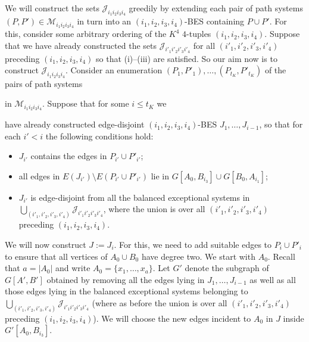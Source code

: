 \documentclass{memo-l}
\def\COMMENT#1{}
\def\proof{\removelastskip\penalty55\medskip\noindent{\bf Proof. }}
\def\cM{\mathcal{M}}
\numberwithin{section}{chapter}
\numberwithin{equation}{section}
\numberwithin{firstthm}{section}
\numberwithin{figure}{section}
\begin{document}
{\proof
We will construct the sets $\mathcal{J}_{i_1i_2i_3i_4}$ greedily by extending each pair of path systems $(P,P')\in \cM_{i_1i_2i_3i_4}$
in turn into an $(i_1,i_2,i_3,i_4)$-BES containing $P\cup P'$. For this, 
consider some arbitrary ordering of the $K^4$ $4$-tuples $(i_1,i_2,i_3,i_4)$.  
Suppose that we have already constructed the sets ${\mathcal J}_{i'_1i'_2i'_3i'_4}$ for all 
$(i'_1,i'_2,i'_3,i'_4)$ preceding $(i_1,i_2,i_3,i_4)$ so that (i)--(iii) are satisfied. So our aim now is to construct ${\mathcal J}_{i_1i_2i_3i_4}$.
Consider an enumeration $(P_1,P'_1),\dots,(P_{t_K},P'_{t_K})$ of the pairs of path systems%
    \COMMENT{Daniela replaced matchings by paths systems}
in $\cM_{i_1i_2i_3i_4}$.
Suppose that for some $i\le t_K$ we%
   \COMMENT{Daniela added for some $i\le t_K$}
have already constructed edge-disjoint $(i_1,i_2,i_3,i_4)$-BES $J_1,\dots,J_{i-1}$, so that for each $i'<i$
the following conditions hold:
\begin{itemize}
\item $J_{i'}$ contains the edges in $P_{i'}\cup P'_{i'}$;
\item all edges in $E(J_{i'})\setminus E(P_{i'}\cup P'_{i'})$ lie in $G[A_0,B_{i_3}]\cup G[B_0,A_{i_1}]$;
\item $J_{i'}$ is edge-disjoint from all the balanced exceptional systems in \\ $\bigcup_{(i'_1,i'_2,i'_3,i'_4)} {\mathcal J}_{i'_1i'_2i'_3i'_4}$,
where the union is over all $(i'_1,i'_2,i'_3,i'_4)$ preceding $(i_1,i_2,i_3,i_4)$.
\end{itemize}
We will now construct $J:=J_i$. For this, we need to add suitable edges to $P_i\cup P'_i$ to ensure that all vertices  of $A_0 \cup B_0$ 
have degree two. We start with $A_0$. Recall that $a=|A_0|$ and write  $A_0=\{x_1,\dots,x_a\}$. 
Let $G'$ denote the subgraph of $G[A',B']$ obtained by removing all the edges lying in $J_1,\dots,J_{i-1}$ as well as all
those edges lying in the balanced exceptional systems belonging to $\bigcup_{(i'_1,i'_2,i'_3,i'_4)} {\mathcal J}_{i'_1i'_2i'_3i'_4}$ (where as before the union
is over all $(i'_1,i'_2,i'_3,i'_4)$ preceding $(i_1,i_2,i_3,i_4)$). 
We will choose the new edges incident to $A_0$ in $J$ inside $G'[A_0,B_{i_3}]$.

}
\end{document}

